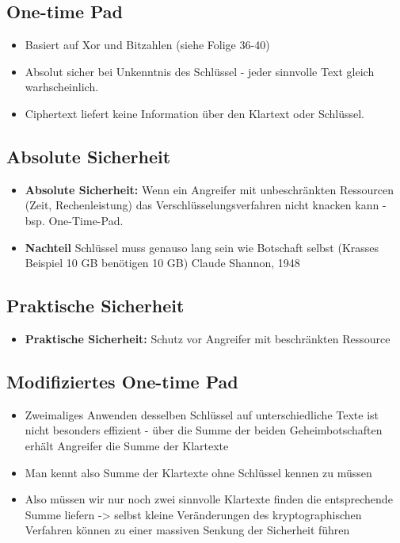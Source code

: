 \documentclass[a4paper,10pt]{scrartcl}
\begin{document}
\subsection{One-time Pad}
\begin{itemize}
\item Basiert auf Xor und Bitzahlen (siehe Folige 36-40)
\item Absolut sicher bei Unkenntnis des Schlüssel - jeder sinnvolle Text gleich warhscheinlich.
\item Ciphertext liefert keine Information über den Klartext oder Schlüssel.
\end{itemize}
\subsection{Absolute Sicherheit}
\begin{itemize}
\item \textbf{Absolute Sicherheit: } Wenn ein Angreifer mit unbeschränkten Ressourcen (Zeit, Rechenleistung) das Verschlüsselungsverfahren nicht knacken kann 
- bsp. One-Time-Pad.
\item \textbf{Nachteil} Schlüssel muss genauso lang sein wie Botschaft selbst (Krasses Beispiel 10 GB benötigen 10 GB) Claude Shannon, 1948
\end{itemize}
\subsection{Praktische Sicherheit}
\begin{itemize}
\item \textbf{Praktische Sicherheit: } Schutz vor Angreifer mit beschränkten Ressource
\end{itemize}
\subsection{Modifiziertes One-time Pad}
\begin{itemize}
\item Zweimaliges Anwenden desselben Schlüssel auf unterschiedliche Texte ist nicht besonders effizient - über die Summe der beiden Geheimbotschaften erhält Angreifer die
Summe der Klartexte
\item Man kennt also Summe der Klartexte ohne Schlüssel kennen zu müssen
\item Also müssen wir nur noch zwei sinnvolle Klartexte finden die entsprechende Summe liefern -> selbst kleine Veränderungen des kryptographischen Verfahren können zu einer
massiven Senkung der Sicherheit führen
\end{itemize}
\end{document}
